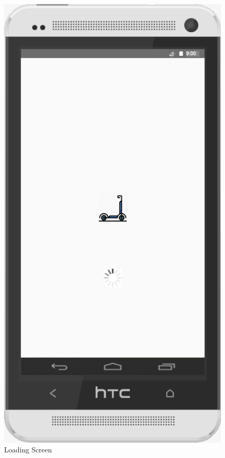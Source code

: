 \documentclass[a4paper, 12pt]{article}
\begin{document}
\begin{figure} [htbp]
  \begin{center}
    \includegraphics[scale=0.6]{06-loading-screen.png}
  \end{center}
  \caption{Loading Screen}
\end{figure}
\end{document}
